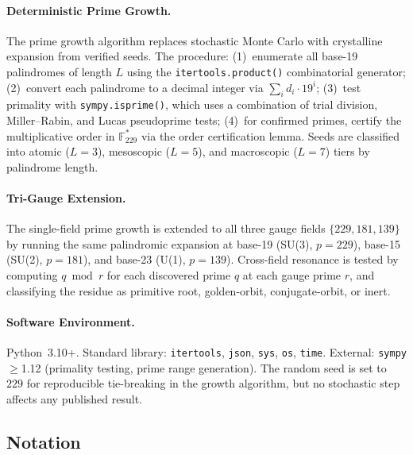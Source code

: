\paragraph{Deterministic Prime Growth.}
The prime growth algorithm replaces stochastic Monte Carlo with crystalline expansion from verified seeds. The procedure: (1)~enumerate all base-19 palindromes of length $L$ using the \texttt{itertools.product()} combinatorial generator; (2)~convert each palindrome to a decimal integer via $\sum_i d_i \cdot 19^i$; (3)~test primality with \texttt{sympy.isprime()}, which uses a combination of trial division, Miller--Rabin, and Lucas pseudoprime tests; (4)~for confirmed primes, certify the multiplicative order in $\mathbb{F}_{229}^*$ via the order certification lemma. Seeds are classified into atomic ($L=3$), mesoscopic ($L=5$), and macroscopic ($L=7$) tiers by palindrome length.

\paragraph{Tri-Gauge Extension.}
The single-field prime growth is extended to all three gauge fields $\{229, 181, 139\}$ by running the same palindromic expansion at base-19 (SU(3), $p = 229$), base-15 (SU(2), $p = 181$), and base-23 (U(1), $p = 139$). Cross-field resonance is tested by computing $q \bmod r$ for each discovered prime $q$ at each gauge prime $r$, and classifying the residue as primitive root, golden-orbit, conjugate-orbit, or inert.

\paragraph{Software Environment.}
Python~3.10+. Standard library: \texttt{itertools}, \texttt{json}, \texttt{sys}, \texttt{os}, \texttt{time}. External: \texttt{sympy}$\geq$1.12 (primality testing, prime range generation). The random seed is set to $229$ for reproducible tie-breaking in the growth algorithm, but no stochastic step affects any published result.

\subsection{Notation}

